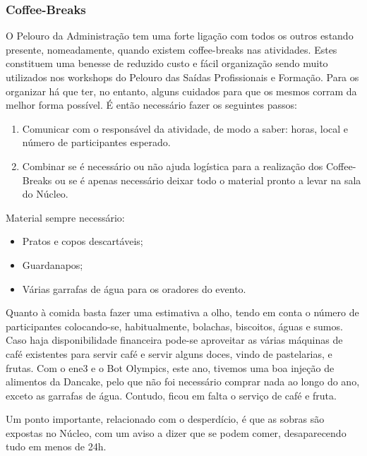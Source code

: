 
\subsubsection{Coffee-Breaks}

O Pelouro da Administração tem uma forte ligação com todos os outros estando presente, nomeadamente, quando existem coffee-breaks nas atividades. Estes constituem uma benesse de reduzido custo e fácil organização sendo muito utilizados nos workshops do Pelouro das Saídas Profissionais e Formação. Para os organizar há que ter, no entanto, alguns cuidados para que os mesmos corram da melhor forma possível.
É então necessário fazer os seguintes passos:
\begin{enumerate}
    \item Comunicar com o responsável da atividade, de modo a saber: horas, local e número de participantes esperado.
    \item Combinar se é necessário ou não ajuda logística para a realização dos Coffee-Breaks ou se é apenas necessário deixar todo o material pronto a levar na sala do Núcleo.
\end{enumerate}

Material sempre necessário:
\begin{itemize}
    \item Pratos e copos descartáveis;
    \item Guardanapos;
    \item Várias garrafas de água para os oradores do evento.
\end{itemize}

Quanto à comida basta fazer uma estimativa a olho, tendo em conta o número de participantes colocando-se, habitualmente, bolachas, biscoitos, águas e sumos. Caso haja disponibilidade financeira pode-se aproveitar as várias máquinas de café existentes para servir café e servir alguns doces, vindo de pastelarias, e frutas. Com o \acrshort{ene3} e o Bot Olympics, este ano, tivemos uma boa injeção de alimentos da Dancake, pelo que não foi necessário comprar nada ao longo do ano, exceto as garrafas de água. Contudo, ficou em falta o serviço de café e fruta.

Um ponto importante, relacionado com o desperdício, é que as sobras são expostas no Núcleo, com um aviso a dizer que se podem comer, desaparecendo tudo em menos de 24h.